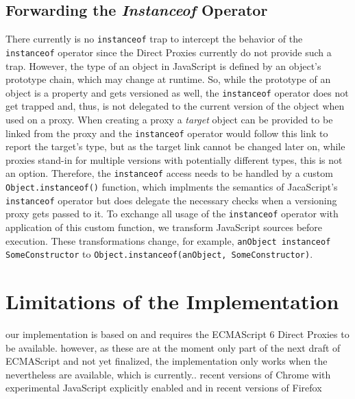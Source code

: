 

\subsection{Forwarding the \emph{Instanceof} Operator}

There currently is no \lstinline{instanceof} trap to intercept the behavior of the \lstinline{instanceof} operator since the Direct Proxies currently do not provide such a trap.
However, the type of an object in JavaScript is defined by an object's prototype chain, which may change at runtime.
So, while the prototype of an object is a property and gets versioned as well, the \lstinline{instanceof} operator does not get trapped and, thus, is not delegated to the current version of the object when used on a proxy.
When creating a proxy a \emph{target} object can be provided to be linked from the proxy and the \lstinline{instanceof} operator would follow this link to report the target's type, but as the target link cannot be changed later on, while proxies stand-in for multiple versions with potentially different types, this is not an option.
Therefore, the \lstinline{instanceof} access needs to be handled by a custom \lstinline{Object.instanceof()} function, which implments the semantics of JacaScript's \lstinline{instanceof} operator but does delegate the necessary checks when a versioning proxy gets passed to it.
To exchange all usage of the \lstinline{instanceof} operator with application of this custom function, we transform JavaScript sources before execution.
These transformations change, for example, \lstinline{anObject instanceof SomeConstructor} to \lstinline{Object.instanceof(anObject, SomeConstructor)}.



\section{Limitations of the Implementation}



our implementation is based on and requires the ECMAScript 6 Direct Proxies to be available.
however, as these are at the moment only part of the next draft of ECMAScript and not yet finalized, the implementation only works when the nevertheless are available, which is currently.. recent versions of Chrome with experimental JavaScript explicitly enabled and in recent versions of Firefox


